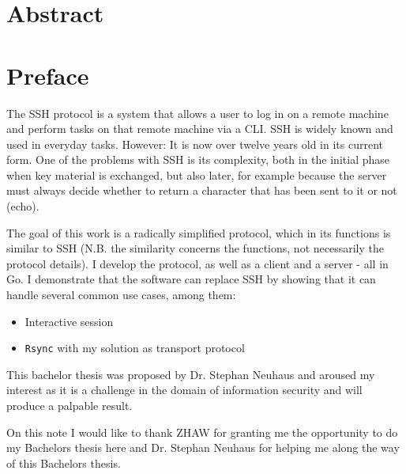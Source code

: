 \documentclass[10pt,a4paper,titlepage,twoside,english,final]{zhawreprt}
\begin{document}
\maketitle

\chapter*{Abstract}\label{sec:Abstract}


\chapter*{Preface}\label{sec:Preface}
The \gls{SSH} protocol \citep{rfc253,rfc6668,rfc8268,rfc8308,rfc8332} is a system that allows a user to log in on a remote machine and perform tasks on that remote machine via a \gls{CLI}. \gls{SSH} is widely known and used in everyday tasks. However: It is now over twelve years old in its current form. One of the problems with \gls{SSH} is its complexity, both in the initial phase when key material is exchanged, but also later, for example because the server must always decide whether to return a character that has been sent to it or not (echo).

The goal of this work is a radically simplified protocol, which in its functions is similar to \gls{SSH} (N.B. the similarity concerns the functions, not necessarily the protocol details). I develop the protocol, as well as a client and a server - all in \gls{Go}. I demonstrate that the software can replace \gls{SSH} by showing that it can handle several common use cases, among them:

\begin{itemize}
\item Interactive session
\item \texttt{Rsync} with my solution as transport protocol
\end{itemize}

This bachelor thesis was proposed by Dr. Stephan Neuhaus \citep{BA19_neut_03} and aroused my interest as it is a challenge in the domain of information security and will produce a palpable result.

On this note I would like to thank \gls{ZHAW} for granting me the opportunity to do my Bachelors thesis here and Dr. Stephan Neuhaus for helping me along the way of this Bachelors thesis.
\end{document}
